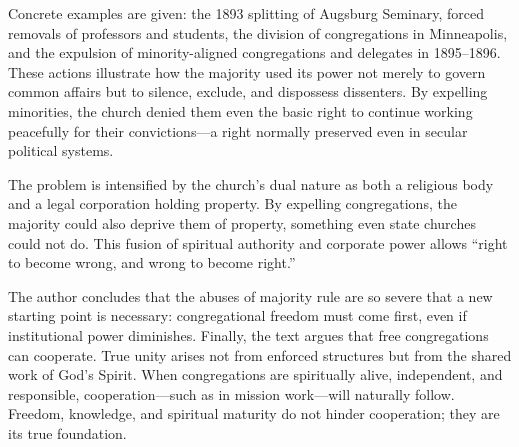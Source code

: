 Concrete examples are given: the 1893 splitting of Augsburg Seminary, forced removals of professors and students, the division of congregations in Minneapolis, and the expulsion of minority-aligned congregations and delegates in 1895–1896. These actions illustrate how the majority used its power not merely to govern common affairs but to silence, exclude, and dispossess dissenters. By expelling minorities, the church denied them even the basic right to continue working peacefully for their convictions—a right normally preserved even in secular political systems.

The problem is intensified by the church’s dual nature as both a religious body and a legal corporation holding property. By expelling congregations, the majority could also deprive them of property, something even state churches could not do. This fusion of spiritual authority and corporate power allows “right to become wrong, and wrong to become right.”

The author concludes that the abuses of majority rule are so severe that a new starting point is necessary: congregational freedom must come first, even if institutional power diminishes. Finally, the text argues that free congregations can cooperate. True unity arises not from enforced structures but from the shared work of God’s Spirit. When congregations are spiritually alive, independent, and responsible, cooperation—such as in mission work—will naturally follow. Freedom, knowledge, and spiritual maturity do not hinder cooperation; they are its true foundation.
